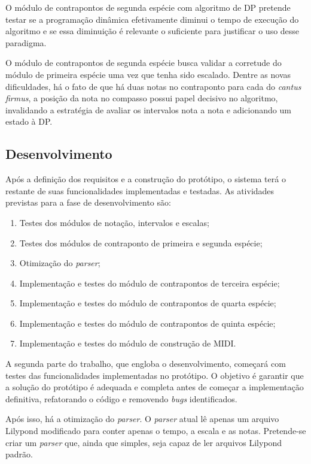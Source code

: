     O módulo de contrapontos de segunda espécie com algoritmo de DP pretende testar se a programação dinâmica efetivamente diminui o tempo de execução do algoritmo e se essa diminuição é relevante o suficiente para justificar o uso desse paradigma.

    O módulo de contrapontos de segunda espécie busca validar a corretude do módulo de primeira espécie uma vez que tenha sido escalado. Dentre as novas dificuldades, há o fato de que há duas notas no contraponto para cada do \textit{cantus firmus}, a posição da nota no compasso possui papel decisivo no algoritmo, invalidando a estratégia de avaliar os intervalos nota a nota e adicionando um estado à DP.

  \subsection[Desenvolvimento]{Desenvolvimento}

    Após a definição dos requisitos e a construção do protótipo, o sistema terá o restante de suas funcionalidades implementadas e testadas. As atividades previstas para a fase de desenvolvimento são:

    \begin{enumerate}
      \item Testes dos módulos de notação, intervalos e escalas;
      \item Testes dos módulos de contraponto de primeira e segunda espécie;
      \item Otimização do \textit{parser};
      \item Implementação e testes do módulo de contrapontos de terceira espécie;
      \item Implementação e testes do módulo de contrapontos de quarta espécie;
      \item Implementação e testes do módulo de contrapontos de quinta espécie;
      \item Implementação e testes do módulo de construção de MIDI.
    \end{enumerate}

    A segunda parte do trabalho, que engloba o desenvolvimento, começará com testes das funcionalidades implementadas no protótipo. O objetivo é garantir que a solução do protótipo é adequada e completa antes de começar a implementação definitiva, refatorando o código e removendo \textit{bugs} identificados.

    Após isso, há a otimização do \textit{parser}. O \textit{parser} atual lê apenas um arquivo Lilypond modificado para conter apenas o tempo, a escala e as notas. Pretende-se criar um \textit{parser} que, ainda que simples, seja capaz de ler arquivos Lilypond padrão.

